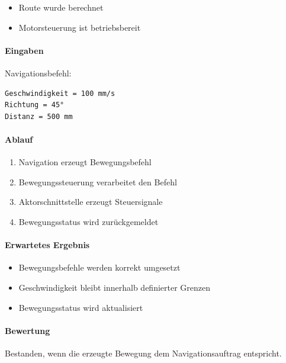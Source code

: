 \documentclass[
  a4paper,
  12pt,
  DIV=12,        %
  parskip=half,  %
  headings=small %
]{scrartcl}
\theoremstyle{definition}
\providecommand{\tightlist}{%
  \setlength{\itemsep}{0pt}\setlength{\parskip}{0pt}}
\theoremstyle{definition}
\begin{document}
\begin{itemize}
\tightlist
\item
  Route wurde berechnet
\item
  Motorsteuerung ist betriebsbereit
\end{itemize}

\paragraph{Eingaben}\label{eingaben-11}

Navigationsbefehl:

\begin{verbatim}
Geschwindigkeit = 100 mm/s
Richtung = 45°
Distanz = 500 mm
\end{verbatim}

\paragraph{Ablauf}\label{ablauf-11}

\begin{enumerate}
\def\labelenumi{\arabic{enumi}.}
\tightlist
\item
  Navigation erzeugt Bewegungsbefehl
\item
  Bewegungssteuerung verarbeitet den Befehl
\item
  Aktorschnittstelle erzeugt Steuersignale
\item
  Bewegungsstatus wird zurückgemeldet
\end{enumerate}

\paragraph{Erwartetes Ergebnis}\label{erwartetes-ergebnis-11}

\begin{itemize}
\tightlist
\item
  Bewegungsbefehle werden korrekt umgesetzt
\item
  Geschwindigkeit bleibt innerhalb definierter Grenzen
\item
  Bewegungsstatus wird aktualisiert
\end{itemize}

\paragraph{Bewertung}\label{bewertung-11}

Bestanden, wenn die erzeugte Bewegung dem Navigationsauftrag entspricht.
\end{document}
